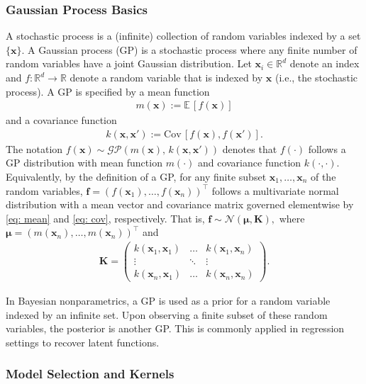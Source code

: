 \documentclass[journal=jacsat,manuscript=article]{achemso}
\newcommand{\reals}{\ensuremath{\mathbb{R}}}
\newcommand{\xvec}{\ensuremath{\mathbf{x}}}
\begin{document}
\subsubsection{Gaussian Process Basics}
A stochastic process is a (infinite) collection of random variables indexed by a set $\{\xvec\}$. A Gaussian process (GP) is a stochastic process where any finite number of random variables have a joint Gaussian distribution. Let $\xvec_i \in \reals^d$ denote an index and $f: \reals^d \rightarrow \reals$ denote a random variable that is indexed by $\xvec$ (i.e., the stochastic process). A GP is specified by a mean function
\begin{gather}
    m(\xvec) := \mathbb{E}\,[f(\xvec)] \label{eq: mean}
\end{gather}
and a covariance function
\begin{gather}
    k(\xvec, \xvec') := \text{Cov}\,[f(\xvec), f(\mathbf{x'})]. \label{eq: cov}
\end{gather}
The notation $f(\xvec)\sim \mathcal{GP}(m(\xvec), \, k(\xvec,\xvec'))$
denotes that $f(\cdot)$ follows a GP distribution with mean function $m(\cdot)$ and covariance function $k(\cdot,\cdot)$. Equivalently, by the definition of a GP, for any finite subset $\xvec_1, \dots, \xvec_n$ of the random variables, $\mathbf{f}=(f(\xvec_1),  \dots, f(\xvec_n))^\intercal$ follows a multivariate normal distribution with a mean vector and covariance matrix governed elementwise by \eqref{eq: mean} and \eqref{eq: cov}, respectively. That is, $\mathbf{f} \sim \mathcal{N}(\boldsymbol{\mu}, \mathbf{K}),$ where $\boldsymbol{\mu} = (m(\xvec_n), \dots, m(\xvec_n))^\intercal$ and
\begin{gather} 
    \mathbf{K} = 
    \left(
    \begin{matrix}
        k(\xvec_1,\xvec_1) & \dots & k(\xvec_1,\xvec_n) \\
        \vdots & \ddots & \vdots \\
        k(\xvec_n,\xvec_1) & \dots & k(\xvec_n,\xvec_n)
    \end{matrix}\right).
\end{gather}

In Bayesian nonparametrics, a GP is used as a prior for a random variable indexed by an infinite set. Upon observing a finite subset of these random variables, the posterior is another GP. This is commonly applied in regression settings to recover latent functions.

\subsubsection{Model Selection and Kernels}
\end{document}
